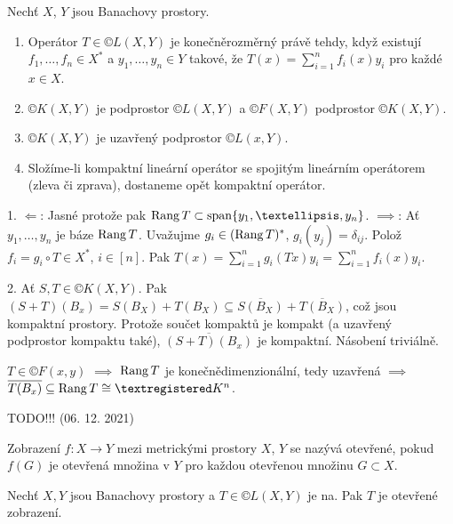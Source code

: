 \documentclass[12pt]{article}					%
\begin{document}
\begin{veta}
	Nechť $X$, $Y$ jsou Banachovy prostory.

	\begin{enumerate}
		\item Operátor $T \in ©L(X, Y)$ je konečněrozměrný právě tehdy, když existují $f_1, …, f_n \in X^*$ a $y_1, …, y_n \in Y$ takové, že $T(x) = \sum_{i = 1}^n f_i(x)y_i$ pro každé $x \in X$.
		\item $©K(X, Y)$ je podprostor $©L(X, Y)$ a $©F(X, Y)$ podprostor $©K(X, Y)$.
		\item $©K(X, Y)$ je uzavřený podprostor $©L(x, Y)$.
		\item Složíme-li kompaktní lineární operátor se spojitým lineárním operátorem (zleva či zprava), dostaneme opět kompaktní operátor.
	\end{enumerate}

	\begin{dukazin}
		1. $\Leftarrow$: Jasné protože pak $\Rang T \subset \spn\{y_1, …, y_n\}$. $\implies$: Ať $y_1, …, y_n$ je báze $\operatorname{Rang} T$. Uvažujme $g_i \in (\operatorname{Rang} T)^*$, $g_i(y_j) = \delta_{ij}$. Polož $f_i = g_i \circ T \in X^*$, $i \in [n]$. Pak $T(x) = \sum_{i=1}^n g_i(Tx)y_i = \sum_{i=1}^n f_i(x)y_i$.

		2. Ať $S, T \in ©K(X, Y)$. Pak $(S + T)(B_x) = S(B_X) + T(B_X) \subseteq \overline{S(B_X)} + \overline{T(B_X)}$, což jsou kompaktní prostory. Protože součet kompaktů je kompakt (a uzavřený podprostor kompaktu také), $\overline{(S + T)(B_x)}$ je kompaktní. Násobení triviálně.

		$T \in ©F(x, y)$ $\implies$ $\operatorname{Rang} T$ je konečnědimenzionální, tedy uzavřená $\implies$ $\overline{T(B_x)} \subseteq \Rang T \cong ®K^n$.
	\end{dukazin}
\end{veta}


TODO!!! (06. 12. 2021)

\begin{definice}
	Zobrazení $f: X \rightarrow Y$ mezi metrickými prostory $X$, $Y$ se nazývá otevřené, pokud $f(G)$ je otevřená množina v $Y$ pro každou otevřenou množinu $G \subset X$.
\end{definice}

\begin{veta}
	Nechť $X, Y$ jsou Banachovy prostory a $T \in ©L(X, Y)$ je na. Pak $T$ je otevřené zobrazení.
\end{veta}
\end{document}
